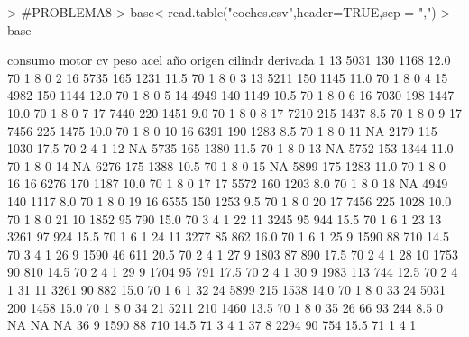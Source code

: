 \documentclass{article}
\begin{document}
\begin{Schunk}
\begin{Sinput}
> #PROBLEMA8
> base<-read.table("coches.csv",header=TRUE,sep = ",")    
> base
\end{Sinput}
\begin{Soutput}
    consumo motor  cv peso acel año origen cilindr derivada
1        13  5031 130 1168 12.0  70      1       8        0
2        16  5735 165 1231 11.5  70      1       8        0
3        13  5211 150 1145 11.0  70      1       8        0
4        15  4982 150 1144 12.0  70      1       8        0
5        14  4949 140 1149 10.5  70      1       8        0
6        16  7030 198 1447 10.0  70      1       8        0
7        17  7440 220 1451  9.0  70      1       8        0
8        17  7210 215 1437  8.5  70      1       8        0
9        17  7456 225 1475 10.0  70      1       8        0
10       16  6391 190 1283  8.5  70      1       8        0
11       NA  2179 115 1030 17.5  70      2       4        1
12       NA  5735 165 1380 11.5  70      1       8        0
13       NA  5752 153 1344 11.0  70      1       8        0
14       NA  6276 175 1388 10.5  70      1       8        0
15       NA  5899 175 1283 11.0  70      1       8        0
16       16  6276 170 1187 10.0  70      1       8        0
17       17  5572 160 1203  8.0  70      1       8        0
18       NA  4949 140 1117  8.0  70      1       8        0
19       16  6555 150 1253  9.5  70      1       8        0
20       17  7456 225 1028 10.0  70      1       8        0
21       10  1852  95  790 15.0  70      3       4        1
22       11  3245  95  944 15.5  70      1       6        1
23       13  3261  97  924 15.5  70      1       6        1
24       11  3277  85  862 16.0  70      1       6        1
25        9  1590  88  710 14.5  70      3       4        1
26        9  1590  46  611 20.5  70      2       4        1
27        9  1803  87  890 17.5  70      2       4        1
28       10  1753  90  810 14.5  70      2       4        1
29        9  1704  95  791 17.5  70      2       4        1
30        9  1983 113  744 12.5  70      2       4        1
31       11  3261  90  882 15.0  70      1       6        1
32       24  5899 215 1538 14.0  70      1       8        0
33       24  5031 200 1458 15.0  70      1       8        0
34       21  5211 210 1460 13.5  70      1       8        0
35       26    66  93  244  8.5   0     NA      NA       NA
36        9  1590  88  710 14.5  71      3       4        1
37        8  2294  90  754 15.5  71      1       4        1

\end{Soutput}
\end{Schunk}
\end{document}
